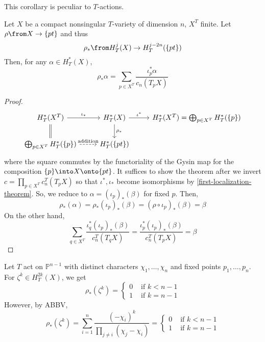 \documentclass[11pt,leqno,oneside]{amsbook}
\renewcommand{\P}{\mathbb{P}}
\numberwithin{thm}{section}
\begin{document}
\begin{rmk}
  This corollary is peculiar to \(T\)-actions.
\end{rmk}
\begin{thm}\label{integration-formula}
  Let \(X\) be a compact nonsingular \(T\)-variety of dimension \(n\),
  \(X^T\) finite. Let \(\rho \from X \to \{pt\}\) and thus \[
    \rho_* \from H_T^j(X) \to H_T^{j-2n}(\{pt\})
  \]
  Then, for any \(\alpha \in H_T^*(X)\), \[
    \rho_* \alpha = \sum_{p \in X^T} \frac{\iota_p^* \alpha}{c_n(T_p X)}
  \]
\end{thm}
\begin{proof}
  \[
    \begin{tikzcd}
      H_T^*(X^T) \ar[r,"\iota_*"] \ar[d,equals]& H_T^*(X)
      \ar[r,"\iota^*"] \ar[d, "\rho_*"]&
      H_T^*(X^T) = \bigoplus_{p \in X^T} H_T^*(\{p\}) \\
      \bigoplus_{p \in X^T} H_T^*(\{p\}) \ar[r, dashed,
      "\text{addition}"] & H_T^*(\{pt\})
    \end{tikzcd}
  \]
  where the square commutes by the functoriality of the Gysin map for
  the composition \(\{p\} \into X \onto \{pt\}\). It
  suffices to show the theorem after we invert \(c = \prod_{p \in X^T}
  c_n^T(T_pX)\) so that \(\iota^*,\iota_*\) become isomorphisms by
  \ref{first-localization-theorem}. So, we reduce to \(\alpha =
  (\iota_p)_*(\beta)\) for fixed \(p\). Then, \[
    \rho_*(\alpha) = \rho_*(\iota_p)_*(\beta) = (\rho \circ
    \iota_p)_*(\beta) = \beta
  \]
  On the other hand, \[
    \sum_{q \in X^T} \frac{\iota_q^*(\iota_p)_*(\beta)}{c_n^T(T_qX)} =
    \frac{\iota_p^*(\iota_p)_*(\beta)}{c_n^T(T_p X)} = \beta
  \]
\end{proof}
\begin{example}
  Let \(T\) act on \(\P^{n-1}\) with distinct characters \(\chi_1,
  \ldots, \chi_n\) and fixed points \(p_1, \ldots, p_n\). For
  \(\zeta^k \in H_T^{2k}(X)\), we get \[
    \rho_*(\zeta^k) =
    \begin{cases}
      0 & \text{ if }k < n-1\\
      1 & \text{ if }k=n-1
    \end{cases}
  \]
  However, by ABBV, \[
    \rho_*(\zeta^k) = \sum_{i=1}^n \frac{(-\chi_i)^k}{\prod_{j \neq
        i}(\chi_j-\chi_i)} =
    \begin{cases}
      0 & \text{ if }k < n-1\\
      1 & \text{ if }k=n-1
    \end{cases}
  \]
\end{example}
\end{document}
